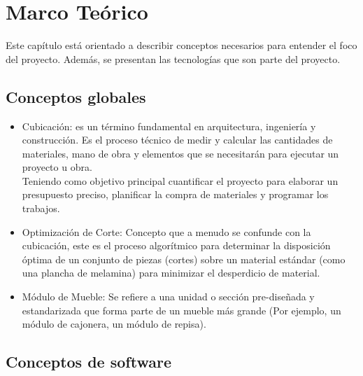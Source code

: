 ﻿\documentclass{iccmemoria}
\begin{document}
\chapter{Marco Teórico}
Este capítulo está orientado a describir conceptos necesarios para entender el foco del proyecto. Además, se presentan las tecnologías que son parte del proyecto.

\section{Conceptos globales}
\begin{itemize}
    \item Cubicación: es un término fundamental en arquitectura, ingeniería y construcción. Es el proceso técnico de medir y calcular las cantidades de materiales, mano de obra y elementos que se necesitarán para ejecutar un proyecto u obra.\\
    Teniendo como objetivo principal cuantificar el proyecto para elaborar un presupuesto preciso, planificar la compra de materiales y programar los trabajos.

    \item Optimización de Corte: Concepto que a menudo se confunde con la cubicación, este es el proceso algorítmico para determinar la disposición óptima de un conjunto de piezas (cortes) sobre un material estándar (como una plancha de melamina) para minimizar el desperdicio de material.

    \item Módulo de Mueble: Se refiere a una unidad o sección pre-diseñada y estandarizada que forma parte de un mueble más grande (Por ejemplo, un módulo de cajonera, un módulo de repisa).

\end{itemize}

\section{Conceptos de software}
\end{document}
